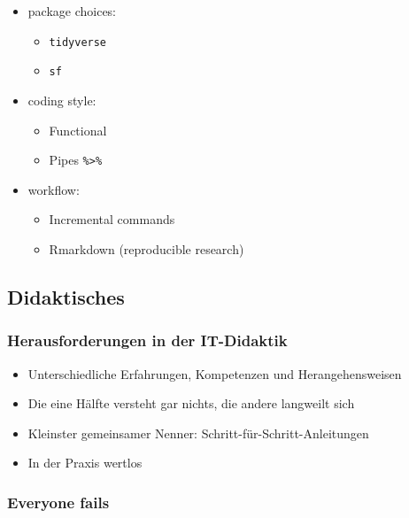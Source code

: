 \documentclass[
  ngerman,
]{article}
\providecommand{\tightlist}{%
  \setlength{\itemsep}{0pt}\setlength{\parskip}{0pt}}
\begin{document}
\begin{itemize}
\tightlist
\item
  package choices:

  \begin{itemize}
  \tightlist
  \item
    \texttt{tidyverse}
  \item
    \texttt{sf}
  \end{itemize}
\item
  coding style:

  \begin{itemize}
  \tightlist
  \item
    Functional
  \item
    Pipes \texttt{\%\textgreater{}\%}
  \end{itemize}
\item
  workflow:

  \begin{itemize}
  \tightlist
  \item
    Incremental commands
  \item
    Rmarkdown (reproducible research)
  \end{itemize}
\end{itemize}

\hypertarget{didaktisches}{%
\subsection{Didaktisches}\label{didaktisches}}

\hypertarget{herausforderungen-in-der-it-didaktik}{%
\subsubsection{Herausforderungen in der IT-Didaktik}\label{herausforderungen-in-der-it-didaktik}}

\begin{itemize}
\tightlist
\item
  Unterschiedliche Erfahrungen, Kompetenzen und Herangehensweisen
\item
  Die eine Hälfte versteht gar nichts, die andere langweilt sich
\item
  Kleinster gemeinsamer Nenner: Schritt-für-Schritt-Anleitungen
\item
  In der Praxis wertlos
\end{itemize}

\hypertarget{everyone-fails}{%
\subsubsection{Everyone fails}\label{everyone-fails}}
\end{document}
